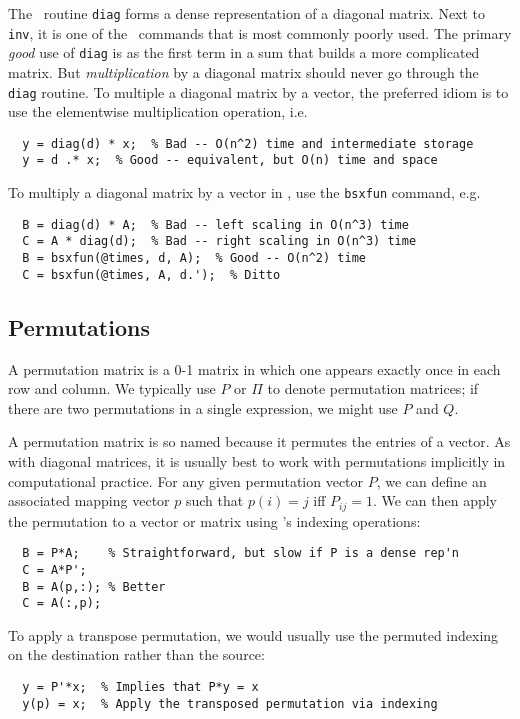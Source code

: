 The \matlab\ routine {\tt diag} forms a dense representation of a
diagonal matrix.  Next to {\tt inv}, it is one of the \matlab\ commands
that is most commonly poorly used.  The primary {\em good} use of
{\tt diag} is as the first term in a sum that builds a more complicated matrix.
But {\em multiplication} by a diagonal matrix should never go through the
{\tt diag} routine.  To multiple a diagonal matrix by a vector, the preferred
idiom is to use the elementwise multiplication operation, i.e.
\begin{lstlisting}
  y = diag(d) * x;  % Bad -- O(n^2) time and intermediate storage
  y = d .* x;  % Good -- equivalent, but O(n) time and space
\end{lstlisting}
To multiply a diagonal matrix by a vector in \matlab, use the {\tt bsxfun}
command, e.g.
\begin{lstlisting}
  B = diag(d) * A;  % Bad -- left scaling in O(n^3) time
  C = A * diag(d);  % Bad -- right scaling in O(n^3) time
  B = bsxfun(@times, d, A);  % Good -- O(n^2) time
  C = bsxfun(@times, A, d.');  % Ditto
\end{lstlisting}

\subsection{Permutations}

A permutation matrix is a 0-1 matrix in which one appears exactly
once in each row and column.  We typically use $P$ or $\Pi$ to
denote permutation matrices; if there are two permutations in a
single expression, we might use $P$ and $Q$.

A permutation matrix is so named because it permutes the entries
of a vector.  As with diagonal matrices, it is usually best to
work with permutations implicitly in computational practice.
For any given permutation vector $P$, we can define an associated
mapping vector $p$ such that $p(i) = j$ iff $P_{ij} = 1$.  We can
then apply the permutation to a vector or matrix using \matlab's
indexing operations:
\begin{lstlisting}
  B = P*A;    % Straightforward, but slow if P is a dense rep'n
  C = A*P';
  B = A(p,:); % Better
  C = A(:,p);
\end{lstlisting}
To apply a transpose permutation, we would usually use the permuted
indexing on the destination rather than the source:
\begin{lstlisting}
  y = P'*x;  % Implies that P*y = x
  y(p) = x;  % Apply the transposed permutation via indexing
\end{lstlisting}

